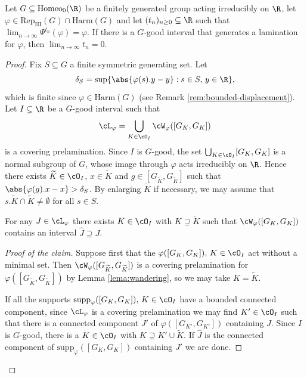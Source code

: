 \documentclass[reqno]{amsart}
\begin{document}
\begin{lema} \label{lema:laminarGgood}
Let $G \subseteq \mathrm{Homeo}_0(\R)$ be a finitely generated group acting irreducibly on $\R$, let $\varphi \in \mathrm{Rep}_\mathrm{III}(G) \cap \mathrm{Harm}(G)$ and let $(t_n)_{n \geq 0} \subseteq \R$ such that $\lim_{n \to \infty} \Psi^{t_n}(\varphi) = \varphi$. If there is a $G$-good interval that generates a lamination for $\varphi$, then $\lim_{n \to \infty} t_n = 0$.
\end{lema}
\begin{proof}
Fix $S \subseteq G$ a finite symmetric generating set. Let
\[
	\delta_S = \sup\{\abs{\varphi(s).y - y} : s \in S,\,  y \in \R\},
\]
which is finite since $\varphi \in \mathrm{Harm}(G)$ (see Remark \ref{rem:bounded-displacement}). Let $I \subsetneq \R$ be a $G$-good interval such that
\[
	\cL_\varphi = \bigcup_{K \in \cO_I} \cW_\varphi([G_K, G_K])
\]
is a covering prelamination.  Since $I$ is $G$-good, the set $\bigcup_{K \in \cO_I}[G_K, G_K]$ is a normal subgroup of $G$, whose image through $\varphi$ acts irreducibly on $\R$. Hence there exists $\widetilde{K} \in \cO_I$, $x \in \widetilde{K}$ and $g \in [G_{\widetilde{K}}, G_{\widetilde{K}}]$ such that $\abs{\varphi(g).x - x} > \delta_S$. By enlarging $\widetilde{K}$ if necessary, we may assume that $s.\widetilde{K}\cap\widetilde{K} \neq \emptyset$ for all $s \in S$.

\setcounter{claimnum}{0}
\begin{claimnum} \label{claim:JK}
	For any $J \in \cL_\varphi$ there exists $K \in \cO_I$ with $K \supseteq \widetilde{K}$ such that $\cW_\varphi([G_K, G_K])$ contains an interval $\hat{J} \supseteq J$.
\end{claimnum}
\begin{proof}[Proof of the claim]
Suppose first that the $\varphi([G_K, G_K]),\, K \in \cO_I$ act without a minimal set. Then $\cW_\varphi([G_{\widetilde{K}}, G_{\widetilde{K}}])$ is a covering prelamination for $\varphi([G_{\widetilde{K}}, G_{\widetilde{K}}])$ by Lemma \ref{lema:wandering}, so we may take $K = \widetilde{K}$.

If all the supports $\mathrm{supp}_\varphi([G_K, G_K]),\, K \in \cO_I$ have a bounded connected component, since $\cL_\varphi$ is a covering prelamination we may find $K' \in \cO_I$ such that there is a connected component $J'$ of $\varphi([G_{K'}, G_{K'}])$ containing $J$. Since $I$ is $G$-good, there is a $K \in \cO_I$ with $K \supseteq K'\cup \widetilde{K}$. If $\hat{J}$ is the connected component of $\mathrm{supp}_\varphi([G_K, G_K])$ containing $J'$ we are done.
\end{proof}


\end{proof}
\end{document}
